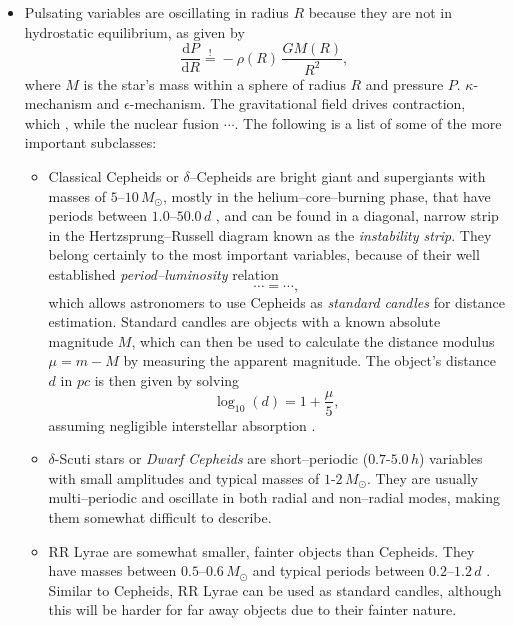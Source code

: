 \begin{itemize}
\item Pulsating variables are oscillating in radius $R$ because they are not in hydrostatic equilibrium, as given by
\begin{equation}
\label{eq:hydrostatic-equilibrium}
\frac{\mathrm{d}P}{\mathrm{d}R} \overset{!}= - \rho(R) \, \frac{G M(R)}{R^2},
\end{equation}
where $M$ is the star's mass within a sphere of radius $R$ and pressure $P$. $\kappa$-mechanism and $\epsilon$-mechanism. The gravitational field drives contraction, which , while the nuclear fusion $\cdots$. 
The following is a list of some of the more important subclasses:
	\begin{itemize}[label=$\circ$]
	\item Classical Cepheids or $\delta$--Cepheids are bright giant and supergiants with masses of $5$--$10 \, \unit{M_\odot}$, mostly in the helium--core--burning phase, that have periods between $1.0$--$50.0 \, \unit{d}$ \citep{cox1980}, and can be found in a diagonal, narrow strip in the Hertzsprung--Russell diagram known as the \emph{instability strip}. They belong certainly to the most important variables, because of their well established \emph{period--luminosity} relation
	\begin{equation}
	\label{eq:period-luminosity-relation}
	\cdots = \cdots,
	\end{equation}
	which allows astronomers to use Cepheids as \emph{standard candles} for distance estimation. Standard candles are objects with a known absolute magnitude $M$, which can then be used to calculate the distance modulus $\mu = m - M$ by measuring the apparent magnitude. The object's distance $d$ in $\unit{pc}$ is then given by solving
	\begin{equation}
	\log_{10}(d) = 1 + \frac{\mu}{5},
	\end{equation}
	assuming negligible interstellar absorption \citep{hanslmeier2007}. 
	\item $\delta$-Scuti stars or \emph{Dwarf Cepheids} are short--periodic ($0.7$-$5.0 \, \unit{h}$) variables with small amplitudes and typical masses of $1$-$2 \, \unit{M_\odot}$. They are usually multi--periodic and oscillate in both radial and non--radial modes, making them somewhat difficult to describe.
	\item RR Lyrae are somewhat smaller, fainter objects than Cepheids. They have masses between $0.5$--$0.6 \, \unit{M_\odot}$ and typical periods between $0.2 $--$1.2 \, \unit{d}$ \citep{unsoeld2001}. Similar to Cepheids, RR Lyrae can be used as standard candles, although this will be harder for far away objects due to their fainter nature.

\end{itemize}
\end{itemize}

